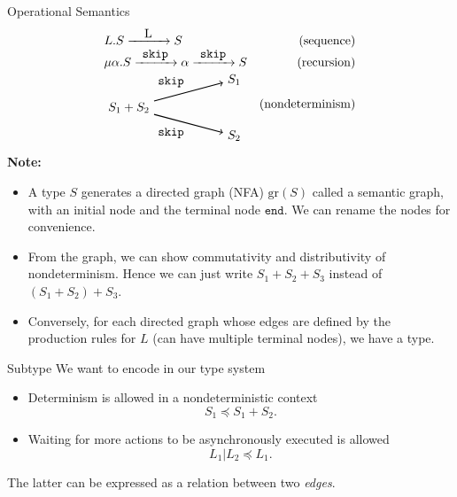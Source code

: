 \begin{frame}{Operational Semantics}
  $$\begin{array}{lr}
      L.S \xrightarrow{\makebox[1cm][c]{L}} S
                                                      & \text{(sequence)}       \\
      \mu\alpha.S
      \xrightarrow{\makebox[1cm][c]{\texttt{skip}}} \alpha
      \xrightarrow{\makebox[1cm][c]{\texttt{skip}}} S & \text{(recursion)}      \\

      \begin{tikzpicture}[baseline={(current bounding box.center)}, ->, thick]
        \node (src) at (0,0) {\( S_1 + S_2 \)};
        \node (tgt1) at (3,0.8) {\( S_1 \)};
        \node (tgt2) at (3,-0.8) {\( S_2 \)};

        \draw[->] (src) -- node[above left] {\texttt{skip}} (tgt1);
        \draw[->] (src) -- node[below left] {\texttt{skip}} (tgt2);
      \end{tikzpicture}

                                                      & \text{(nondeterminism)} \\
    \end{array}$$
  \textbf{Note:}
  \begin{itemize}
    \item A type $S$ generates a directed graph (NFA) $\text{gr}(S)$ called a semantic graph, with an initial node and the terminal node $\texttt{end}$. We can rename the nodes for convenience.
    \item From the graph, we can show commutativity and distributivity of nondeterminism. Hence we can just write $S_1+S_2+S_3$ instead of $(S_1+S_2)+S_3$.
    \item Conversely, for each directed graph whose edges are defined by the production rules for $L$ (can have multiple terminal nodes), we have a type.
  \end{itemize}



\end{frame}

\begin{frame}{Subtype}
  We want to encode in our type system
  \begin{itemize}
    \item Determinism is allowed in a nondeterministic context
          $$S_1\preceq S_1+S_2.$$
    \item Waiting for more actions to be asynchronously executed is allowed
          $$L_1|L_2 \preceq L_1.$$
  \end{itemize}

  The latter can be expressed as a relation between two \textit{edges}.
\end{frame}

